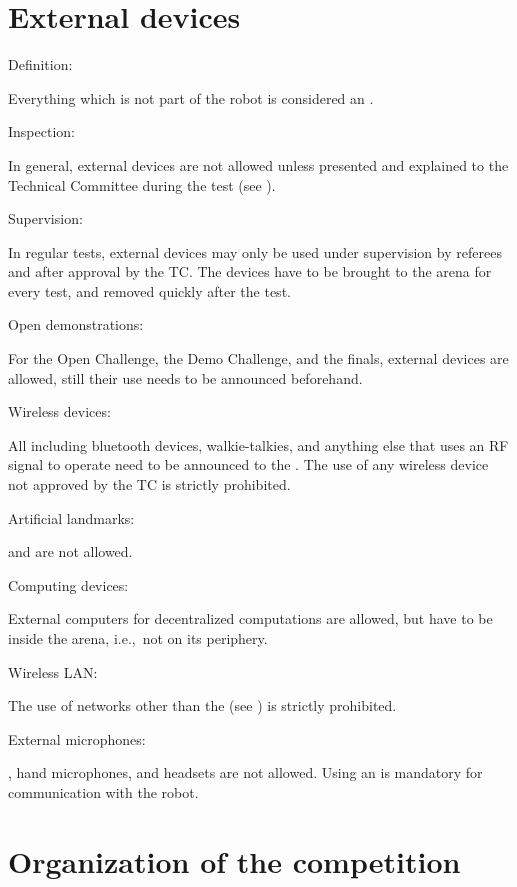 \section{External devices}\label{rule:roobt_external_devices}
\begin{enumerate}
{\bf\item Definition:} Everything which is not part of the robot is considered an . 
{\bf\item Inspection:} In general, external devices are not allowed unless 
  presented and explained to the Technical Committee during the  test (see ).
{\bf\item Supervision:} In regular tests, external devices may only be used under supervision by referees and after approval by the TC. 
The devices have to be brought to the arena for every test, and removed quickly after the test.
{\bf\item Open demonstrations:} For the Open Challenge, the Demo Challenge, and the finals, 
  external devices are allowed, still their use needs to be announced beforehand.
{\bf\item Wireless devices:} All  including bluetooth devices, walkie-talkies, and anything else that uses an RF signal to operate need to be announced to the . 
The use of any wireless device not approved by the TC is strictly prohibited.  
{\bf\item Artificial landmarks:}  and  are not allowed.
{\bf\item Computing devices:} External computers for decentralized computations are allowed, but have to be inside the arena, i.e.,~not on its periphery.
{\bf\item Wireless LAN:} The use of networks other than the  (see ) is strictly prohibited.
{\bf\item External microphones: }, hand microphones, and headsets are not allowed. Using an  is mandatory for communication with the robot.
\end{enumerate}



\section{Organization of the competition}\label{sec:procedure_during_competition}

